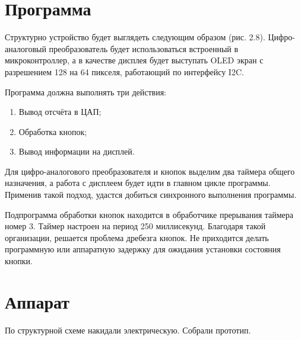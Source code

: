 \documentclass[a4paper, 14pt]{extarticle}
\begin{document}
\section*{Программа}
	Структурно устройство будет выглядеть следующим образом (рис. 2.8). Цифро-аналоговый преобразователь будет использоваться встроенный в микроконтроллер, а в качестве дисплея будет выступать OLED экран с разрешением 128 на 64 пикселя, работающий по интерфейсу I2C.

	Программа должна выполнять три действия:
	
	\begin{enumerate}
		\item Вывод отсчёта в ЦАП;
		\item Обработка кнопок;
		\item Вывод информации на дисплей.
	\end{enumerate}
	
	
	Для цифро-аналогового преобразователя и кнопок выделим два таймера общего назначения, а работа с дисплеем будет идти в главном цикле программы. Применив такой подход, удастся добиться синхронного выполнения программы. 
	
	Подпрограмма обработки кнопок находится в обработчике прерывания таймера номер 3. Таймер настроен на период 250 миллисекунд. Благодаря такой организации, решается проблема дребезга кнопок. Не приходится делать программную или аппаратную задержку для ожидания установки состояния кнопки.
	
\section*{Аппарат}
	По структурной схеме накидали электрическую. Собрали прототип.
\end{document}
